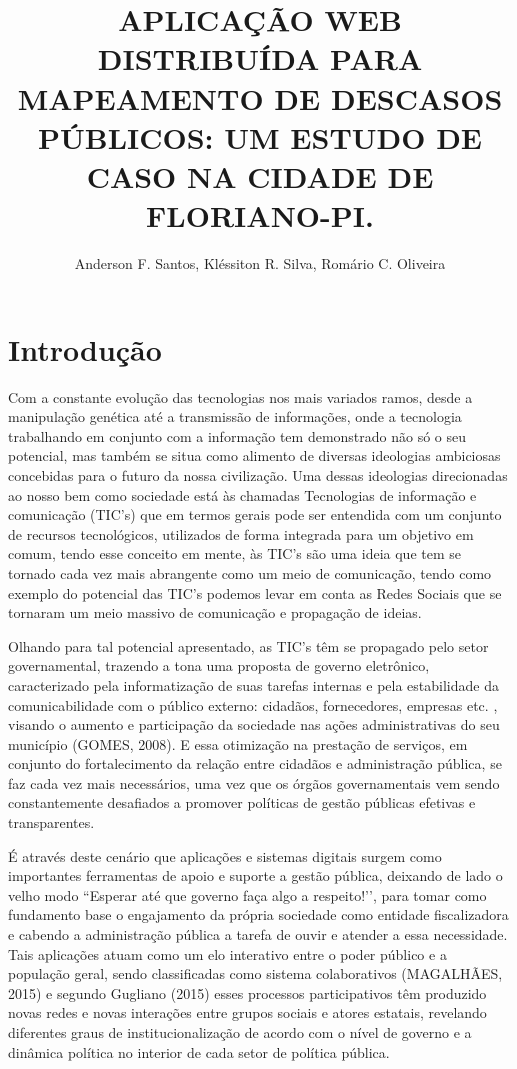 \documentclass[12pt]{article}
\title{APLICAÇÃO WEB DISTRIBUÍDA PARA MAPEAMENTO DE DESCASOS PÚBLICOS: UM ESTUDO DE CASO NA CIDADE DE FLORIANO-PI.}
\author{Anderson F. Santos, Kléssiton R. Silva, Romário C. Oliveira}
\begin{document}
 

\maketitle

\begin{abstract}


\end{abstract}
     
\begin{resumo} 
  
  
\end{resumo}

\section{Introdução}
Com a constante evolução das tecnologias nos mais variados ramos, desde a manipulação genética até a transmissão de informações, onde a tecnologia trabalhando em conjunto com a informação tem  demonstrado não só o seu potencial, mas também se situa como alimento de diversas ideologias ambiciosas concebidas para o futuro da nossa civilização. Uma dessas ideologias direcionadas ao nosso bem como sociedade está às chamadas Tecnologias de informação e comunicação (TIC’s) que em termos gerais pode ser entendida com um conjunto de recursos tecnológicos, utilizados de forma integrada para um objetivo em comum, tendo esse conceito em mente, às TIC’s são uma ideia que tem se tornado cada vez mais abrangente como um meio de comunicação, tendo como exemplo do potencial das TIC’s podemos levar em conta as Redes Sociais que se tornaram um meio massivo de comunicação e propagação de ideias.

Olhando para tal potencial apresentado, as TIC’s têm se propagado pelo setor governamental, trazendo a tona uma proposta de governo eletrônico, caracterizado pela informatização de suas tarefas internas e pela estabilidade da comunicabilidade com o público externo: cidadãos, fornecedores, empresas etc. , visando o aumento e participação da sociedade nas ações administrativas do seu município (GOMES, 2008). E essa otimização na prestação de serviços, em conjunto do fortalecimento da relação entre cidadãos e administração pública, se faz cada vez mais necessários, uma vez que os órgãos governamentais vem sendo constantemente desafiados a promover políticas de gestão públicas efetivas e transparentes.

É através deste cenário que aplicações e sistemas digitais surgem como importantes ferramentas de apoio e suporte a gestão pública, deixando de lado o velho modo “Esperar até que governo faça algo a respeito!’’, para tomar como fundamento base o engajamento da própria sociedade como entidade fiscalizadora e cabendo a administração pública a tarefa de ouvir e atender a essa necessidade. Tais aplicações atuam como um elo interativo entre o poder público e a população geral, sendo classificadas como sistema colaborativos (MAGALHÃES, 2015) e segundo Gugliano (2015) esses processos participativos têm produzido novas redes e novas interações entre grupos sociais e atores estatais, revelando diferentes graus de institucionalização de acordo com o nível de governo e a dinâmica política no interior de cada setor de política pública.
\end{document}
